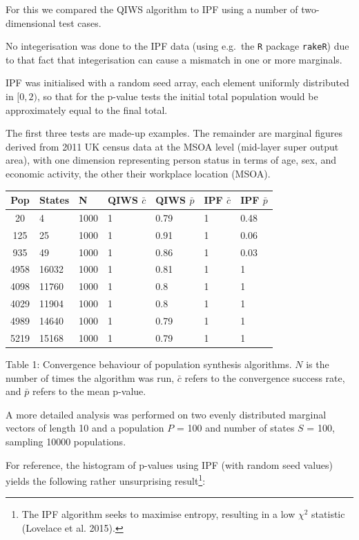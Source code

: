 \documentclass[]{article}
\let\rmarkdownfootnote\footnote%
\def\footnote{\protect\rmarkdownfootnote}
\begin{document}
For this we compared the QIWS algorithm to IPF using a number of
two-dimensional test cases.

No integerisation was done to the IPF data (using e.g.~the \texttt{R}
package \texttt{rakeR}) due to that fact that integerisation can cause a
mismatch in one or more marginals.

IPF was initialised with a random seed array, each element uniformly
distributed in \([0,2)\), so that for the p-value tests the initial total population would be 
approximately equal to the final total.

The first three tests are made-up examples. The remainder are marginal
figures derived from 2011 UK census data at the MSOA level (mid-layer
super output area), with one dimension representing person status in
terms of age, sex, and economic activity, the other their workplace
location (MSOA).

\begin{longtable}[]{@{}cllllll@{}}
\toprule
Pop & States & N & QIWS \(\bar{c}\) & QIWS \(\bar{p}\) & IPF \(\bar{c}\)
& IPF \(\bar{p}\)\tabularnewline
\midrule
\endhead
20 & 4 & 1000 & 1 & 0.79 & 1 & 0.48\tabularnewline
125 & 25 & 1000 & 1 & 0.91 & 1 & 0.06\tabularnewline
935 & 49 & 1000 & 1 & 0.86 & 1 & 0.03\tabularnewline
4958 & 16032 & 1000 & 1 & 0.81 & 1 & 1\tabularnewline
4098 & 11760 & 1000 & 1 & 0.8 & 1 & 1\tabularnewline
4029 & 11904 & 1000 & 1 & 0.8 & 1 & 1\tabularnewline
4989 & 14640 & 1000 & 1 & 0.79 & 1 & 1\tabularnewline
5219 & 15168 & 1000 & 1 & 0.79 & 1 & 1\tabularnewline
\bottomrule
\end{longtable}

\begin{center}
Table 1: Convergence behaviour of population synthesis algorithms. \(N\)
is the number of times the algorithm was run, \(\bar{c}\) refers to the
convergence success rate, and \(\bar{p}\) refers to the mean p-value.
\end{center}

A more detailed analysis was performed on two evenly distributed
marginal vectors of length 10 and a population \(P\) = 100 and number of
states \(S\) = 100, sampling 10000 populations.

For reference, the histogram of p-values using IPF (with random seed
values) yields the following rather unsurprising result\footnote{The IPF algorithm
 seeks to maximise entropy, resulting in a low \(\chi^2\) statistic (Lovelace et al. 2015).}:
\end{document}

